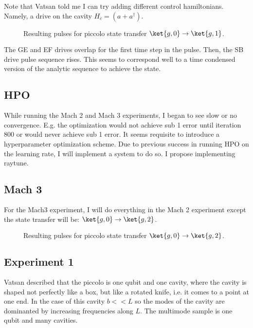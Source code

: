 \documentclass[letterpaper, 12pt]{article}
\begin{document}
Note that Vatsan told me I can try adding different control hamiltonians. Namely, a drive on the cavity $H_{c} = (a + a^{\dagger})$.

\begin{figure}
  \caption{Resulting pulses for piccolo state transfer $\ket{g, 0} \rightarrow \ket{g, 1}$.}
\end{figure}

The GE and EF drives overlap for the first time step in the pulse. Then, the SB drive pulse sequence rises. This seems to correspond well to a time condensed version of the analytic sequence to achieve the state.

\subsection{HPO}
While running the Mach 2 and Mach 3 experiments, I began to see slow or no convergence. E.g. the optimization would not achieve sub 1 error until iteration 800 or would never achieve sub 1 error. It seems requisite to introduce a hyperparameter optimization scheme. Due to previous success in running HPO on the learning rate, I will implement a system to do so. I propose implementing raytune. 

\subsection{Mach 3}
For the Mach3 experiment, I will do everything in the Mach 2 experiment except the state transfer will be: $\ket{g, 0} \rightarrow \ket{g, 2}$.

\begin{figure}
  \caption{Resulting pulses for piccolo state transfer $\ket{g, 0} \rightarrow \ket{g, 2}$.}
\end{figure}

\subsection{Experiment 1}
Vatsan described that the piccolo is one qubit and one cavity, where the cavity is shaped not perfectly like a box, but like a rotated knife, i.e. it comes to a point at one end. In the case of this cavity $b << L$ so the modes of the cavity are dominanted by increasing frequencies along $L$. The multimode sample is one qubit and many cavities.
\end{document}
